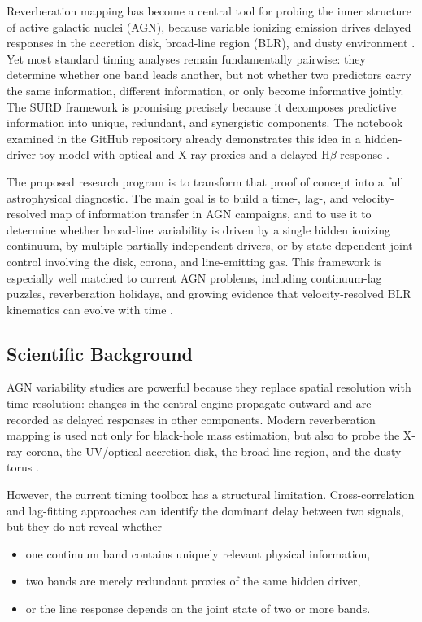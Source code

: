 \documentclass{article}
\begin{document}
Reverberation mapping has become a central tool for probing the inner structure of active galactic nuclei (AGN), because variable ionizing emission drives delayed responses in the accretion disk, broad-line region (BLR), and dusty environment \cite{CackettHorneWinkler2021}. Yet most standard timing analyses remain fundamentally pairwise: they determine whether one band leads another, but not whether two predictors carry the same information, different information, or only become informative jointly. The SURD framework is promising precisely because it decomposes predictive information into unique, redundant, and synergistic components. The notebook examined in the GitHub repository already demonstrates this idea in a hidden-driver toy model with optical and X-ray proxies and a delayed H$\beta$ response \cite{AGN_SURD_notebook}.

The proposed research program is to transform that proof of concept into a full astrophysical diagnostic. The main goal is to build a time-, lag-, and velocity-resolved map of information transfer in AGN campaigns, and to use it to determine whether broad-line variability is driven by a single hidden ionizing continuum, by multiple partially independent drivers, or by state-dependent joint control involving the disk, corona, and line-emitting gas. This framework is especially well matched to current AGN problems, including continuum-lag puzzles, reverberation holidays, and growing evidence that velocity-resolved BLR kinematics can evolve with time \cite{Korista2014,Dehghanian2019,LuEtAl2022,FengEtAl2024}.

\subsection{Scientific Background}

AGN variability studies are powerful because they replace spatial resolution with time resolution: changes in the central engine propagate outward and are recorded as delayed responses in other components. Modern reverberation mapping is used not only for black-hole mass estimation, but also to probe the X-ray corona, the UV/optical accretion disk, the broad-line region, and the dusty torus \cite{CackettHorneWinkler2021}.

However, the current timing toolbox has a structural limitation. Cross-correlation and lag-fitting approaches can identify the dominant delay between two signals, but they do not reveal whether
\begin{itemize}
    \item one continuum band contains uniquely relevant physical information,
    \item two bands are merely redundant proxies of the same hidden driver,
    \item or the line response depends on the joint state of two or more bands.
\end{itemize}
\end{document}
